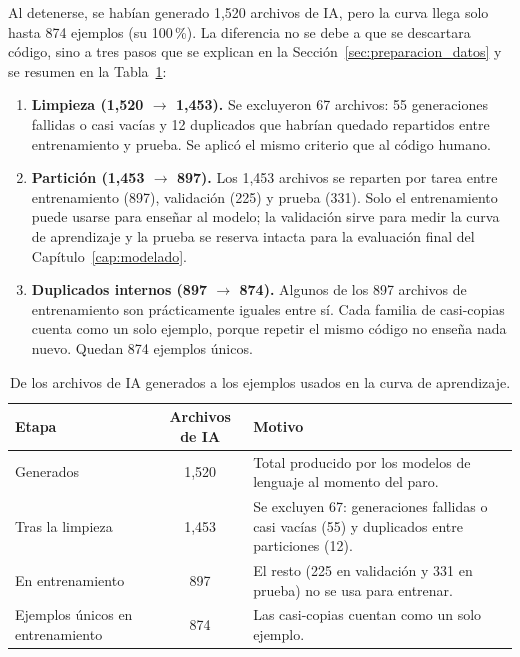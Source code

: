 Al detenerse, se habían generado 1,520 archivos de IA, pero la curva llega solo hasta 874 ejemplos (su 100\,\%). La diferencia no se debe a que se descartara código, sino a tres pasos que se explican en la Sección~\ref{sec:preparacion_datos} y se resumen en la Tabla~\ref{tab:conteo_ia}:

\begin{enumerate}
    \item \textbf{Limpieza (1,520 $\rightarrow$ 1,453).} Se excluyeron 67 archivos: 55 generaciones fallidas o casi vacías y 12 duplicados que habrían quedado repartidos entre entrenamiento y prueba. Se aplicó el mismo criterio que al código humano.
    \item \textbf{Partición (1,453 $\rightarrow$ 897).} Los 1,453 archivos se reparten por tarea entre entrenamiento (897), validación (225) y prueba (331). Solo el entrenamiento puede usarse para enseñar al modelo; la validación sirve para medir la curva de aprendizaje y la prueba se reserva intacta para la evaluación final del Capítulo~\ref{cap:modelado}. 
    \item \textbf{Duplicados internos (897 $\rightarrow$ 874).} Algunos de los 897 archivos de entrenamiento son prácticamente iguales entre sí. Cada familia de casi-copias cuenta como un solo ejemplo, porque repetir el mismo código no enseña nada nuevo. Quedan 874 ejemplos únicos.
\end{enumerate}

\begin{table}[H]
    \centering
    \caption{De los archivos de IA generados a los ejemplos usados en la curva de aprendizaje.}
    \label{tab:conteo_ia}
    \renewcommand{\arraystretch}{1.25}
    \begin{tabularx}{\textwidth}{|l|c|X|}
        \hline
        \textbf{Etapa} & \textbf{Archivos de IA} & \textbf{Motivo} \\ \hline
        Generados & 1,520 & Total producido por los modelos de lenguaje al momento del paro. \\ \hline
        Tras la limpieza & 1,453 & Se excluyen 67: generaciones fallidas o casi vacías (55) y duplicados entre particiones (12). \\ \hline
        En entrenamiento & 897 & El resto (225 en validación y 331 en prueba) no se usa para entrenar. \\ \hline
        Ejemplos únicos en entrenamiento & 874 & Las casi-copias cuentan como un solo ejemplo. \\ \hline
    \end{tabularx}
\end{table}

